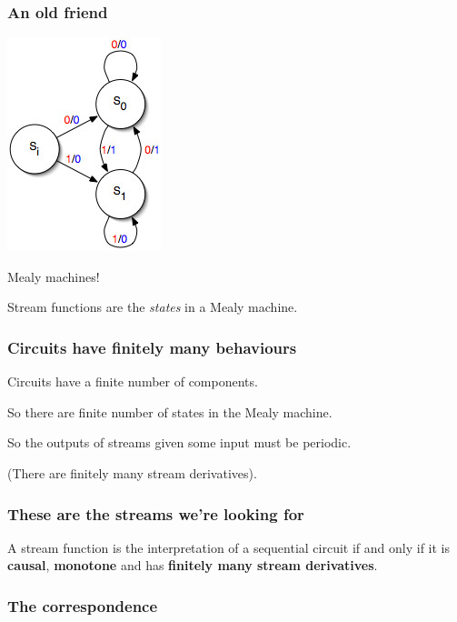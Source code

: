 \begin{frame}
    \frametitle{An old friend}

    \Large

    \begin{center}
        \includegraphics[scale=0.5]{imgs/mealy-machine}

        Mealy machines!

        \pause

        \normalsize
        Stream functions are the \emph{states} in a Mealy machine.
    \end{center}

\end{frame}
\begin{frame}
    \frametitle{Circuits have finitely many behaviours}

    Circuits have a finite number of components.

    \pause

    So there are finite number of states in the Mealy machine.

    \pause

    So the outputs of streams given some input must be \alert{periodic}.

    \pause

    (There are finitely many \alert{stream derivatives}).
\end{frame}
\begin{frame}
    \frametitle{These are the streams we're looking for}

    \begin{theorem}
        A stream function is the interpretation of a sequential circuit
        if and only if it is \textbf{causal}, \textbf{monotone} and has
        \textbf{finitely many stream derivatives}.
    \end{theorem}
\end{frame}
\begin{frame}
    \frametitle{The correspondence}

    \centering

\end{frame}
